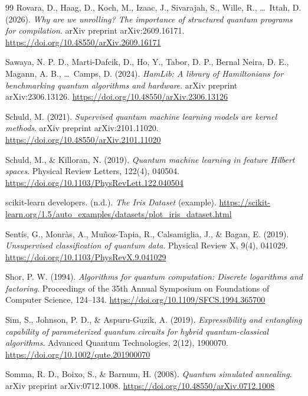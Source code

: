 \begin{thebibliography}{99}
	Rovara, D., Haag, D., Koch, M., Izaac, J., Sivarajah, S., Wille, R., \ldots\ Ittah, D. (2026).
	\emph{Why are we unrolling? The importance of structured quantum programs for compilation}.
	arXiv preprint arXiv:2609.16171.
	\url{https://doi.org/10.48550/arXiv.2609.16171}

	Sawaya, N. P. D., Marti-Dafcik, D., Ho, Y., Tabor, D. P., Bernal Neira, D. E., Magann, A. B., \ldots\ Camps, D. (2024).
	\emph{HamLib: A library of Hamiltonians for benchmarking quantum algorithms and hardware}.
	arXiv preprint arXiv:2306.13126.
	\url{https://doi.org/10.48550/arXiv.2306.13126}

	Schuld, M. (2021).
	\emph{Supervised quantum machine learning models are kernel methods}.
	arXiv preprint arXiv:2101.11020.
	\url{https://doi.org/10.48550/arXiv.2101.11020}

	Schuld, M., \& Killoran, N. (2019).
	\emph{Quantum machine learning in feature Hilbert spaces}.
	Physical Review Letters, 122(4), 040504.
	\url{https://doi.org/10.1103/PhysRevLett.122.040504}

	scikit-learn developers. (n.d.).
	\emph{The Iris Dataset} (example).
	\url{https://scikit-learn.org/1.5/auto_examples/datasets/plot_iris_dataset.html}

	Sent\'is, G., Monr\`as, A., Mu\~noz-Tapia, R., Calsamiglia, J., \& Bagan, E. (2019).
	\emph{Unsupervised classification of quantum data}.
	Physical Review X, 9(4), 041029.
	\url{https://doi.org/10.1103/PhysRevX.9.041029}

	Shor, P. W. (1994).
	\emph{Algorithms for quantum computation: Discrete logarithms and factoring}.
	Proceedings of the 35th Annual Symposium on Foundations of Computer Science, 124--134.
	\url{https://doi.org/10.1109/SFCS.1994.365700}

	Sim, S., Johnson, P. D., \& Aspuru-Guzik, A. (2019).
	\emph{Expressibility and entangling capability of parameterized quantum circuits for hybrid quantum-classical algorithms}.
	Advanced Quantum Technologies, 2(12), 1900070.
	\url{https://doi.org/10.1002/qute.201900070}

	Somma, R. D., Boixo, S., \& Barnum, H. (2008).
	\emph{Quantum simulated annealing}.
	arXiv preprint arXiv:0712.1008.
	\url{https://doi.org/10.48550/arXiv.0712.1008}


\end{thebibliography}
